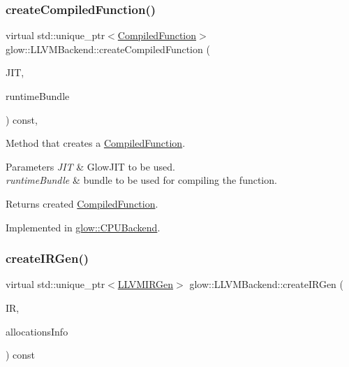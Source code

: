 \subsubsection{\texorpdfstring{create\+Compiled\+Function()}{createCompiledFunction()}}
{\footnotesize\ttfamily virtual std\+::unique\+\_\+ptr$<$\hyperlink{classglow_1_1_compiled_function}{Compiled\+Function}$>$ glow\+::\+L\+L\+V\+M\+Backend\+::create\+Compiled\+Function (\begin{DoxyParamCaption}\item[{std\+::unique\+\_\+ptr$<$ \hyperlink{classllvm_1_1orc_1_1_glow_j_i_t}{llvm\+::orc\+::\+Glow\+J\+IT} $>$}]{J\+IT,  }\item[{\hyperlink{classglow_1_1runtime_1_1_runtime_bundle}{runtime\+::\+Runtime\+Bundle} \&\&}]{runtime\+Bundle }\end{DoxyParamCaption}) const\hspace{0.3cm}{\ttfamily [protected]}, {}}

Method that creates a \hyperlink{classglow_1_1_compiled_function}{Compiled\+Function}. 
\begin{DoxyParams}{Parameters}
{\em J\+IT} & Glow\+J\+IT to be used. \\
\hline
{\em runtime\+Bundle} & bundle to be used for compiling the function. \\
\hline
\end{DoxyParams}
\begin{DoxyReturn}{Returns}
created \hyperlink{classglow_1_1_compiled_function}{Compiled\+Function}. 
\end{DoxyReturn}


Implemented in \hyperlink{classglow_1_1_c_p_u_backend_ad7092a724021d60563985209df1a8f64}{glow\+::\+C\+P\+U\+Backend}.

\mbox{\label{classglow_1_1_l_l_v_m_backend_a10f19018bc4af0aecb2b68f4f532997c}} 
\subsubsection{\texorpdfstring{create\+I\+R\+Gen()}{createIRGen()}}
{\footnotesize\ttfamily virtual std\+::unique\+\_\+ptr$<$\hyperlink{classglow_1_1_l_l_v_m_i_r_gen}{L\+L\+V\+M\+I\+R\+Gen}$>$ glow\+::\+L\+L\+V\+M\+Backend\+::create\+I\+R\+Gen (\begin{DoxyParamCaption}\item[{const \hyperlink{classglow_1_1_i_r_function}{I\+R\+Function} $\ast$}]{IR,  }\item[{\hyperlink{structglow_1_1_allocations_info}{Allocations\+Info} \&}]{allocations\+Info }\end{DoxyParamCaption}) const\hspace{0.3cm}{\ttfamily [pure virtual]}}

